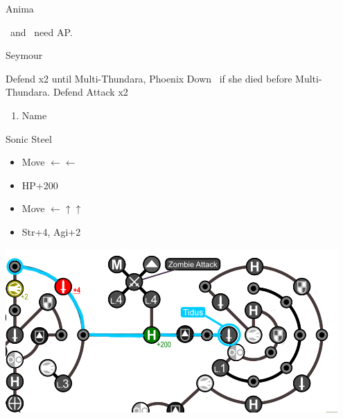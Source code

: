 \begin{battle}[18000]{Anima}
	\begin{itemize}
		      \tidus\ and \yuna\ need AP.
	\end{itemize}
\end{battle}
\begin{battle}[6000]{Seymour}
	\begin{itemize}
		\tidusf Defend x2 until Multi-Thundara, Phoenix Down \rikku\ if she died before Multi-Thundara.
	      \rikkuf Defend
	      \tidusf Attack x2
	\end{itemize}
\end{battle}
\begin{enumerate}[resume]
	\item Name \shiva
\end{enumerate}
\begin{equip}
	\begin{itemize}
		\tidusf Sonic Steel
	\end{itemize}
\end{equip}
\winvfill
\begin{spheregrid}
	\begin{itemize}
		\tidusf
		\begin{itemize}
			\item Move $\leftarrow\leftarrow$
			\item HP+200
			\item Move $\leftarrow\uparrow\uparrow$
			\item Str+4, Agi+2
		\end{itemize}
		\includegraphics[width=.8\columnwidth]{graphics/Tidus_Post_Seymour}
	\end{itemize}
\end{spheregrid}
